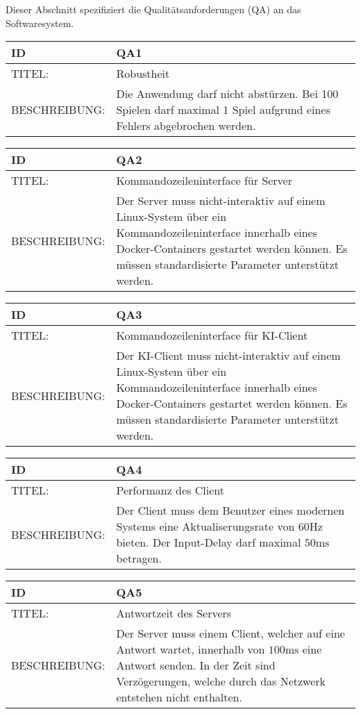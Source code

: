 Dieser Abschnitt spezifiziert die Qualitätsanforderungen (QA) an das Softwaresystem.

\begin{tabularx}{16cm}{l|X}
	 \textbf{ID} & \textbf{QA1} \\
	 \hline
	 TITEL: & Robustheit \\
	 \hline 
	 BESCHREIBUNG: & Die Anwendung darf nicht abstürzen. Bei 100 Spielen darf maximal 1 Spiel
	aufgrund eines Fehlers abgebrochen werden. \\
\end{tabularx}


\begin{tabularx}{16cm}{l|X}
	 \textbf{ID} & \textbf{QA2} \\
	 \hline
	 TITEL: & Kommandozeileninterface für Server \\
	 \hline 
	 BESCHREIBUNG: & Der Server muss nicht-interaktiv auf einem Linux-System über ein Kommandozeileninterface innerhalb eines Docker-Containers gestartet werden können. Es müssen standardisierte Parameter unterstützt werden. 
\end{tabularx} 


\begin{tabularx}{16cm}{l|X}
	 \textbf{ID} & \textbf{QA3} \\
	 \hline
	 TITEL: & Kommandozeileninterface für KI-Client \\
	 \hline 
	 BESCHREIBUNG: & Der KI-Client muss nicht-interaktiv auf einem Linux-System über ein Kommandozeileninterface innerhalb eines Docker-Containers gestartet werden können. Es müssen standardisierte Parameter unterstützt werden. 
\end{tabularx} 


\begin{tabularx}{16cm}{l|X}
	 \textbf{ID} & \textbf{QA4} \\
	 \hline
		TITEL: & Performanz des Client \\
	 \hline 
	 BESCHREIBUNG: & Der Client muss dem Benutzer eines modernen Systems eine Aktualiserungsrate von $60\si{\hertz}$ bieten. Der Input-Delay darf maximal $50\si{\milli\second}$ betragen. 
\end{tabularx} 


\begin{tabularx}{16cm}{l|X}
	 \textbf{ID} & \textbf{QA5} \\
	 \hline
		TITEL: & Antwortzeit des Servers\\ 
	 \hline 
	 BESCHREIBUNG: & Der Server muss einem Client, welcher auf eine Antwort wartet, innerhalb von $100\si{\milli\second}$ eine Antwort senden. In der Zeit sind Verzögerungen, welche durch das Netzwerk entstehen nicht enthalten.
\end{tabularx} 


